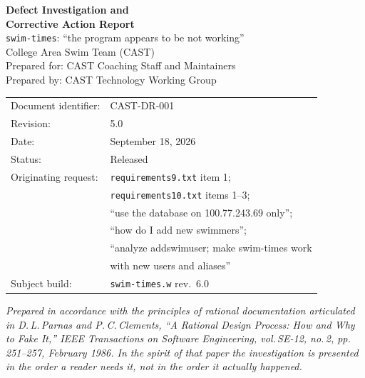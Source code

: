 \documentclass[11pt]{article}
\newcommand{\code}[1]{\texttt{#1}}
\begin{document}
\begin{titlepage}
  \centering
  \vspace*{2cm}
  {\Huge\bfseries\color{castblue} Defect Investigation and\\[0.3em]
   Corrective Action Report\\[0.8em]}
  {\Large \code{swim-times}: ``the program appears to be not working''}\\[2em]
  {\large College Area Swim Team (CAST)}\\[0.5em]
  {\normalsize Prepared for: CAST Coaching Staff and Maintainers}\\[0.5em]
  {\normalsize Prepared by: CAST Technology Working Group}\\[2em]
  \begin{tabular}{ll}
    Document identifier: & CAST-DR-001                                   \\
    Revision:            & 5.0                                           \\
    Date:                & September 18, 2026                            \\
    Status:              & Released                                      \\
    Originating request: & \code{requirements9.txt} item 1;              \\
                         & \code{requirements10.txt} items 1--3;         \\
                         & ``use the database on 100.77.243.69 only'';   \\
                         & ``how do I add new swimmers'';                \\
                         & ``analyze addswimuser; make swim-times work   \\
                         & with new users and aliases''                  \\
    Subject build:       & \code{swim-times.w} rev.\ 6.0                 \\
  \end{tabular}
  \vfill
  {\small\textit{Prepared in accordance with the principles of rational
  documentation articulated in D.\,L.\,Parnas and P.\,C.\,Clements,
  ``A Rational Design Process: How and Why to Fake It,''
  \textit{IEEE Transactions on Software Engineering}, vol.\,SE-12,
  no.\,2, pp.\,251--257, February 1986.  In the spirit of that paper the
  investigation is presented in the order a reader needs it, not in the
  order it actually happened.}}
\end{titlepage}
\end{document}
